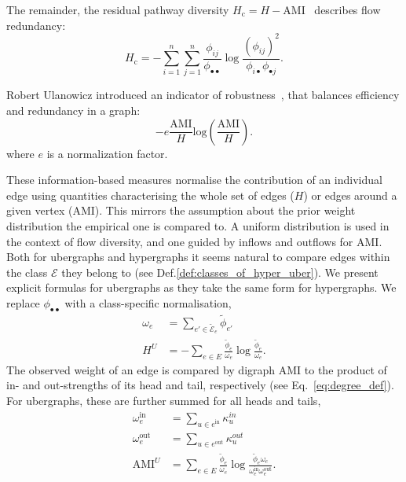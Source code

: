 \documentclass[a4paper,12pt]{article}
\theoremstyle{definition}
\theoremstyle{remark}
\newcommand{\tE}{\tilde{\mathcal{E}}}
\newcommand{\tphi}{\tilde{\phi}}
\begin{document}
The remainder, the residual pathway diversity $H_{\mathrm{c}}=H-\text{AMI}$~\cite{Rutledge_1976} describes flow redundancy:
\begin{equation}
			H_{\text{c}}=-\sum^{n}_{i=1}\sum^{n}_{j=1}\frac{\phi_{ij}}{\phi_{\bullet \bullet}}\log\frac{{\left(\phi_{ij}\right)}^2}{\phi_{i\bullet}\phi_{\bullet j}}.
\end{equation}

Robert Ulanowicz introduced an indicator of robustness~\cite{Ulanowicz_1997, Ulanowicz_2009},  that balances efficiency and redundancy in a graph:
\begin{equation}
	-e\frac{\mathrm{AMI}}{H}\mathrm{log}\left(\frac{\mathrm{AMI}}{H}\right).
\end{equation}
where $e$ is a normalization factor.



These information-based measures normalise the contribution of an individual edge using quantities characterising the whole set of edges ($H$) or edges around a given vertex ($\mathrm{AMI}$). This mirrors the assumption about the prior weight distribution the empirical one is compared to. A uniform distribution is used in the context of flow diversity, and one guided by inflows and outflows for AMI.
Both for ubergraphs and hypergraphs it seems natural to compare edges within the class $\mathcal{E}$ they belong to (see Def.\ref{def:classes_of_hyper_uber}). We present explicit formulas for ubergraphs as they take the same form for hypergraphs. We replace $\phi_{\bullet \bullet}$ with a class-specific normalisation, 
\begin{align}
    \omega_e&=\sum_{e' \in \tE_e} \tphi_{e'} \\
    H^U&=-\sum_{e \in E } \frac{\tphi_{e}}{\omega_e}\log\frac{\tphi_{e}}{\omega_e}.
\end{align}
The observed weight of an edge is compared by digraph AMI to the product of in- and out-strengths of its head and tail, respectively (see Eq.~\ref{eq:degree_def}). For ubergraphs, these are further summed for all heads and tails,
\begin{align}
    \omega_e^{\text{in}}&=\sum_{u \in e^{\mathrm{in}}} \kappa_{u}^{in} \\
    \omega_e^{\text{out}}&=\sum_{u \in e^{\mathrm{out}}} \kappa_{u}^{out} \\
    \text{AMI}^U&=\sum_{e \in E}
    \frac{\tphi_e}{\omega_e} \log\frac{\tphi_e\omega_e}{\omega_e^{\text{in}} \omega_e^{\text{out}}}.
\end{align}
\end{document}
